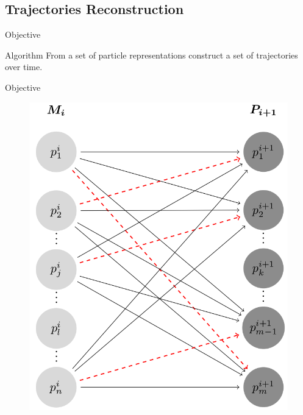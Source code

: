 \documentclass{beamer}
\begin{document}
	\subsection{Trajectories Reconstruction}	
		\begin{frame}{Objective}
			\begin{block}{Algorithm}
				From a set of particle representations construct a set of trajectories over time.
			\end{block}
			
			
			
		\end{frame}
		\begin{frame}{Objective}
	
		\begin{figure}
					\centering
					\includegraphics[scale=0.18]{./images/graph.png}
				\end{figure}
			
			
			
		\end{frame}
\end{document}
